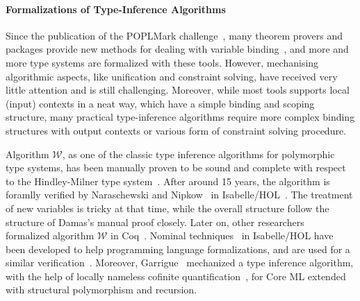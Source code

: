 \paragraph{Formalizations of Type-Inference Algorithms}
Since the publication of the {\sc POPLMark} challenge~\cite{aydemir2005mechanized},
many theorem provers and packages provide new methods for dealing
with variable binding~\cite{aydemir2008engineering,urban2008nominalTech,chlipala2008parametric},
and more and more type systems are formalized with these tools.
However, mechanising algorithmic aspects, like unification and
constraint solving, have received very little attention and is still challenging.
Moreover, while most tools supports local (input) contexts in a neat way, which have a simple
binding and scoping structure, many practical type-inference algorithms require
more complex binding structures with output contexts or various form of constraint solving procedure.

Algorithm $\mathcal{W}$,
as one of the classic type inference algorithms for polymorphic type systems,
has been manually proven to be sound and complete
with respect to the Hindley-Milner type system~\cite{}.
After around 15 years, the algorithm is foramlly verified by
Naraschewski and Nipkow~\cite{naraschewski1999type} in Isabelle/HOL~\cite{nipkow2002isabelle}.
The treatment of new variables is tricky at that time, while the overall structure follow the
structure of Damas's manual proof closely.
Later on, other researchers~\cite{dubois2000proving,dubois1999certification}
formalized algorithm $\mathcal{W}$ in Coq~\cite{Coq}.
Nominal techniques~\cite{urban2008nominalTech} in Isabelle/HOL have been
developed to help programming language formalizations, and are used for a similar
verification~\cite{urban2008nominal}. Moreover, Garrigue~\cite{garrigue2015certified}
mechanized a type inference algorithm,
with the help of locally nameless cofinite quantification~\cite{},
for Core ML extended with structural polymorphism and recursion.
